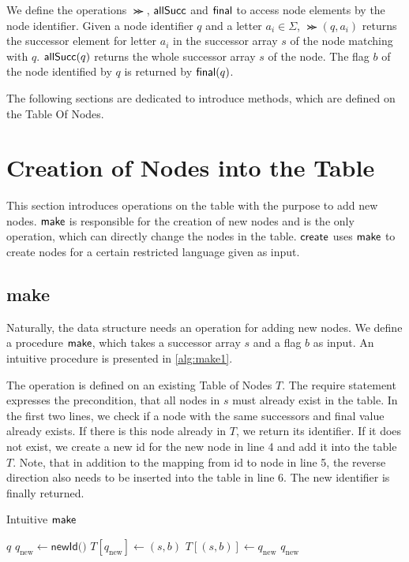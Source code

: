 We define the operations $\Succ$, $\operatorname{\textsf{allSucc}}$ and $\operatorname{\textsf{final}}$ to access node elements by the node identifier.
Given a node identifier $q$ and a letter $a_{i} \in \Sigma$, $\Succ(q,a_{i})$ returns the successor element for letter $a_{i}$ in the successor array $s$ of the node matching with $q$. $\operatorname{\textsf{allSucc}}(q)$ returns the whole successor array $s$ of the node. The flag $b$ of the node identified by $q$ is returned by $\operatorname{\textsf{final}}(q)$.

\par 

The following sections are dedicated to introduce methods, which are defined on the Table Of Nodes. 

\section{Creation of Nodes into the Table}
This section introduces operations on the table with the purpose to add new nodes. $\operatorname{\textsf{make}}$ is responsible for the creation of new nodes and is the only operation, which can directly change the nodes in the table. $\operatorname{\textsf{create}}$ uses $\operatorname{\textsf{make}}$ to create nodes for a certain restricted language given as input.

\subsection{make}
Naturally, the data structure needs an operation for adding new nodes. We define a procedure $\operatorname{\textsf{make}}$, which takes a successor array $s$ and a flag $b$ as input. An intuitive procedure is presented in \autoref{alg:make1}. 

\par

The operation is defined on an existing Table of Nodes $T$.
The require statement expresses the precondition, that all nodes in $s$ must already exist in the table. In the first two lines, we check if a node with the same successors and final value already exists. If there is this node already in $T$, we return its identifier. If it does not exist, we create a new id for the new node in line 4 and add it into the table $T$. Note, that in addition to the mapping from id to node in line 5, the reverse direction also needs to be inserted into the table in line 6. The new identifier is finally returned.

\begin{algorithm}
\caption{Intuitive $\operatorname{\textsf{make}}$}\label{alg:make1}
\begin{algorithmic}[1]
\Return $q$
\Else
\State $q_{\text{new}} \gets \textsf{newId()}$
\State $T[q_{\text{new}}] \gets (s,b)$
\State $T[(s,b)] \gets q_{\text{new}}$
\Return $q_{\text{new}}$
\EndIf
\end{algorithmic}
\end{algorithm}


